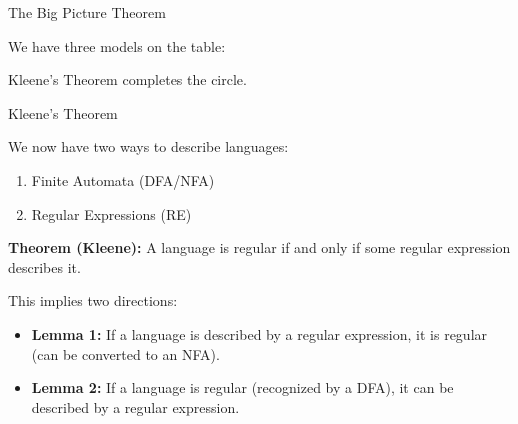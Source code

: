 \documentclass[10pt,aspectratio=169]{beamer}
\begin{document}
\begin{frame}{The Big Picture Theorem}

We have three models on the table:

\vspace{0.6em}
\begin{center}
\end{center}

\vspace{0.8em}
Kleene's Theorem completes the circle.

\end{frame}

\begin{frame}{Kleene's Theorem}

We now have two ways to describe languages:
\begin{enumerate}
    \item Finite Automata (DFA/NFA)
    \item Regular Expressions (RE)
\end{enumerate}

\vspace{1em}

\textbf{Theorem (Kleene):} A language is regular if and only if some regular expression describes it.

\vspace{1em}

This implies two directions:
\begin{itemize}
    \item \textbf{Lemma 1:} If a language is described by a regular expression, it is regular (can be converted to an NFA).
    \item \textbf{Lemma 2:} If a language is regular (recognized by a DFA), it can be described by a regular expression.
\end{itemize}

\end{frame}
\end{document}
